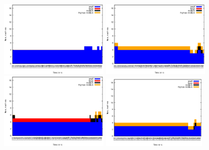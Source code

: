 \begin{figure}[htb]
	\begin{minipage}[b]{0.20\linewidth}
		\vspace{-3mm}
		\includegraphics[width=\linewidth,height=3.8cm]{images/exps2011/low/das/inst_type_machines.eps}	
	\end{minipage}
\begin{minipage}[b]{0.19\linewidth}
		\vspace{-3mm}
		\includegraphics[width=\linewidth,height=3.8cm]{images/exps2011/medium_down/das/inst_type_machines.eps}
	\end{minipage}
	\begin{minipage}[b]{0.19\linewidth}
		\vspace{-3mm}
		\includegraphics[width=\linewidth,height=3.8cm]{images/exps2011/medium/das/inst_type_machines.eps}
	\end{minipage}
	\begin{minipage}[b]{0.20\linewidth}
		\vspace{-2mm}
		\includegraphics[width=\linewidth,height=3.68cm]{images/exps2011/medium_up/das/inst_type_machines.eps}

\end{minipage}
\end{figure}
